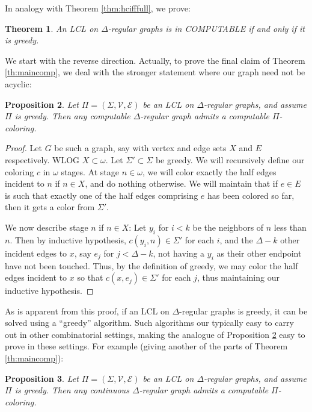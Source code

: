 \documentclass[11pt]{amsart}
\newtheorem{theorem}{Theorem}
\newtheorem{prop}[theorem]{Proposition}
\theoremstyle{definition}
\newcommand{\V}{\mathcal{V}}
\begin{document}
In analogy with Theorem \ref{thm:hcifffull}, we prove:

\begin{theorem}\label{thm:ciffgreedy}
    An LCL on $\Delta$-regular graphs is in COMPUTABLE if and only if it is greedy.
\end{theorem}

We start with the reverse direction. Actually, to prove the final claim of Theorem \ref{th:maincomp}, we deal with the stronger statement where our graph need not be acyclic:

\begin{prop}\label{prop:greedytocomp}
        Let $\Pi = (\Sigma,\V,\mathcal{E})$ be an LCL on $\Delta$-regular graphs, and assume $\Pi$ is greedy. Then any computable $\Delta$-regular graph admits a computable $\Pi$-coloring.
\end{prop}

\begin{proof}
    Let $G$ be such a graph, say with vertex and edge sets $X$ and $E$ respectively. WLOG $X \subset \omega$. Let $\Sigma' \subset \Sigma$ be greedy. We will recursively define our coloring $c$ in $\omega$ stages. At stage $n \in \omega$, we will color exactly the half edges incident to $n$ if $n \in X$, and do nothing otherwise. We will maintain that if $e \in E$ is such that exactly one of the half edges comprising $e$ has been colored so far, then it gets a color from $\Sigma'$.
    
    We now describe stage $n$ if $n \in X$: Let $y_i$ for $i < k$ be the neighbors of $n$ less than $n$. Then by inductive hypothesis, $c(y_i,n) \in \Sigma'$ for each $i$, and the $\Delta-k$ other incident edges to $x$, say $e_j$ for $j < \Delta - k$, not having a $y_i$ as their other endpoint have not been touched. Thus, by the definition of greedy, we may color the half edges incident to $x$ so that $c(x,e_j) \in \Sigma'$ for each $j$, thus maintaining our inductive hypothesis. 
\end{proof}

As is apparent from this proof, if an LCL on $\Delta$-regular graphs is greedy, it can be solved using a ``greedy'' algorithm. Such algorithms our typically easy to carry out in other combinatorial settings, making the analogue of Proposition \ref{prop:greedytocomp} easy to prove in these settings. For example (giving another of the parts of Theorem \ref{th:maincomp}):

\begin{prop}\label{prop:greedytocts}
    Let $\Pi = (\Sigma,\V,\mathcal{E})$ be an LCL on $\Delta$-regular graphs, and assume $\Pi$ is greedy. Then any continuous $\Delta$-regular graph admits a computable $\Pi$-coloring.
\end{prop}
\end{document}

